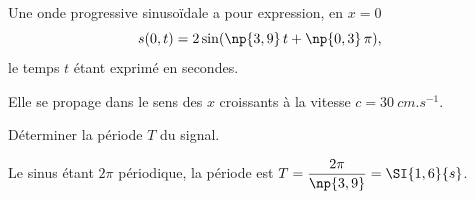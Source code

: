 
\finEntrainement







\hauteurLargeurCadreReponse		{8mm}{5cm}
\initialisationEntrainement

Une onde progressive sinusoïdale a pour expression, en $x=0$
\[
s(0, t)=2\sin(\np{3,9}\, t+ \np{0,3}\, \pi),
\] 
le temps $t$ étant exprimé en secondes. 

Elle se propage dans le sens des $x$ croissants à la vitesse 
$c=\SI{30}{cm.s^{-1}}$.

\debutEntrainement



\begin{enonce}
Déterminer la période $T$ du signal.
\end{enonce}


\begin{corrige}
Le sinus étant $2\pi$ périodique, la période est $T=\dfrac{2\pi}{\np{3,9}}=\SI{1,6}{s}$.
\end{corrige}




